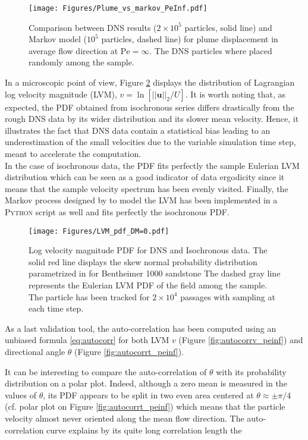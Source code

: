 \begin{figure}[h!]
	\centering
	\texttt{[image: Figures/Plume\_vs\_markov\_PeInf.pdf]}
	\caption{Comparison between DNS results ($2\times 10^5$ particles, solid line) and Markov model ($10^5$ particles, dashed line) for plume displacement in average flow direction at $\mathrm{Pe}=\infty$. The DNS particles where placed randomly among the sample.}
	\label{fig:plume_peinf}
\end{figure}

In a microscopic point of view, Figure \ref{fig:lvm_pdf_peinf} displays the distribution of Lagrangian log velocity magnitude (LVM), $v = \ln[||\textbf{u}||_2/U]$. 
It is worth noting that, as expected, the PDF obtained from isochronous series differs drastically from the rough DNS data by its wider distribution and its slower mean velocity.
Hence, it illustrates the fact that DNS data contain a statistical bias leading to an underestimation of the small velocities due to the variable simulation time step, meant to accelerate the computation.\\
In the case of isochronous data, the PDF fits perfectly the sample Eulerian LVM distribution which can be seen as a good indicator of data ergodicity since it means that the sample velocity spectrum has been evenly visited.
Finally, the Markov process designed by \cite{Meyer2016} to model the LVM has been implemented in a \textsc{Python} script as well and fits perfectly the isochronous PDF.

\begin{figure}
	\centering
	\texttt{[image: Figures/LVM\_pdf\_DM=0.pdf]}
	\caption{Log velocity magnitude PDF for DNS and Isochronous data. The solid red line displays the skew normal probability distribution parametrized in \citet{Meyer2016} for Bentheimer 1000 sandstone The dashed gray line represents the Eulerian LVM PDF of the field among the sample. The particle has been tracked for $2\times 10^4$ passages with sampling at each time step.}
	\label{fig:lvm_pdf_peinf}
\end{figure}

As a last validation tool, the auto-correlation has been computed using an unbiased formula \eqref{eq:autocorr} for both LVM $v$ (Figure \ref{fig:autocorrv_peinf}) and directional angle $\theta$ (Figure \ref{fig:autocorrt_peinf}). 

It can be interesting to compare the auto-correlation of $\theta$ with its probability distribution on a polar plot. 
Indeed, although a zero mean is measured in the values of $\theta$, its PDF appears to be split in two even area centered at $\theta\approx\pm\pi/4$ (cf. polar plot on Figure \ref{fig:autocorrt_peinf}) which means that the particle velocity almost never oriented along the mean flow direction.
The auto-correlation curve explains by its quite long correlation length the  



